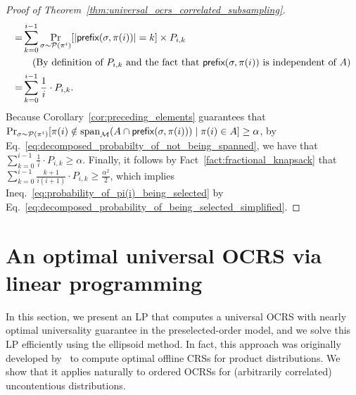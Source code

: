 \documentclass[11pt]{article}
\newcommand{\M}{{\mathcal M}}
\newcommand{\cP}{\mathcal P}
\newcommand{\pref}{\textnormal{\sffamily prefix}}
\newcommand{\spa}{\textnormal{span}}
\begin{document}
\begin{proof}[Proof of Theorem~\ref{thm:universal_ocrs_correlated_subsampling}]
\begin{align}
=&\sum_{k=0}^{i-1}\Pr_{\sigma\sim\cP(\pi^i)}[|\pref(\sigma,\pi(i))|=k]\times P_{i,k}\nonumber\\
&\quad\text{(By definition of $P_{i,k}$ and the fact that $\pref(\sigma,\pi(i))$ is independent of $A$)}\nonumber\\
=&\sum_{k=0}^{i-1}\frac{1}{i}\cdot P_{i,k}.
\end{align}
Because Corollary~\ref{cor:preceding_elements} guarantees that $\Pr_{\sigma\sim\cP(\pi^i)}[\pi(i)\notin\spa_{\M}(A\cap \pref(\sigma,\pi(i)))\mid \pi(i)\in A]\ge\alpha$, by Eq.~\eqref{eq:decomposed_probabilty_of_not_being_spanned}, we have that $\sum_{k=0}^{i-1}\frac{1}{i}\cdot P_{i,k}\ge\alpha$. Finally, it follows by Fact~\ref{fact:fractional_knapsack} that $\sum_{k=0}^{i-1} \frac{k+1}{i(i+1)}\cdot P_{i,k}\ge\frac{\alpha^2}{2}$, which implies Ineq.~\eqref{eq:probability_of_pi(i)_being_selected} by Eq.~\eqref{eq:decomposed_probability_of_being_selected_simplified}.
\end{proof} 
\section{An optimal universal OCRS via linear programming}\label{sec:ocrs_lp}
In this section, we present an LP that computes a universal OCRS with nearly optimal universality guarantee in the preselected-order model, and we solve this LP efficiently using the ellipsoid method. In fact, this approach was originally developed by~\citet{chekuri2014submodular} to compute optimal offline CRSs for product distributions. We show that it applies naturally to ordered OCRSs for (arbitrarily correlated) uncontentious distributions.
\end{document}
